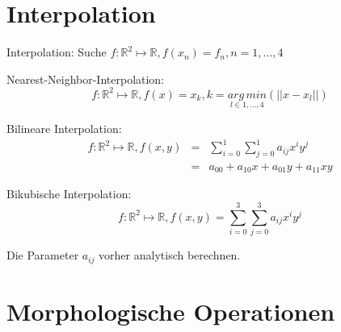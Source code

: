 \section{Interpolation}

Interpolation: Suche 
\( f: \mathbb{R}^2\mapsto\mathbb{R}, f(x_n)=f_n, n=1,...,4 \)

Nearest-Neighbor-Interpolation:
\begin{equation*}
f: \mathbb{R}^2\mapsto\mathbb{R},f(x)=x_k,k=\underset{{l \in {1,..., 4}}}{arg\,min} (||x-x_l||)
\end{equation*}


Bilineare Interpolation:
\begin{eqnarray*}
 f: \mathbb{R}^2\mapsto\mathbb{R}, f(x, y)&=&\sum_{i=0}^1 \sum_{j=0}^1 a_{ij}x^iy^j \\
&=&a_{00}+a_{10}x+a_{01}y+a_{11}xy
\end{eqnarray*}

Bikubische Interpolation:
\begin{equation*}
 f: \mathbb{R}^2\mapsto\mathbb{R}, f(x, y)=\sum_{i=0}^3 \sum_{j=0}^3 a_{ij}x^iy^j
\end{equation*}

Die Parameter \(a_{ij} \) vorher analytisch berechnen.

\section{Morphologische Operationen}


